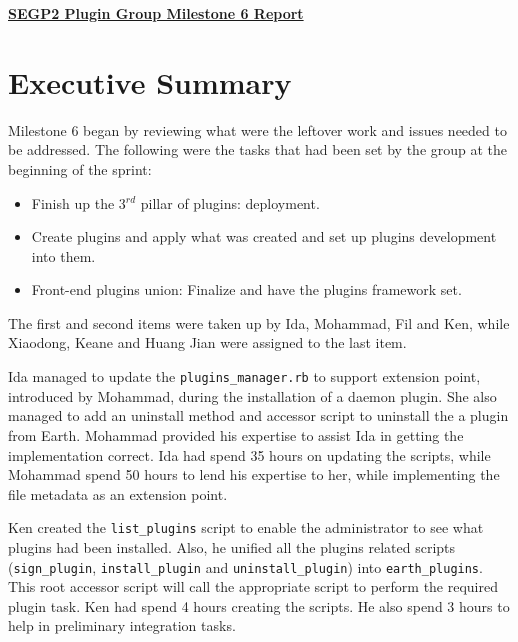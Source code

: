 \documentclass{article}
\begin{document}
\pagestyle{headings}

\begin{center}
{\textbf{\underline{SEGP2 Plugin Group Milestone 6 Report}}}
\end{center}


\section*{Executive Summary}

Milestone 6 began by reviewing what were the leftover work and issues needed to be addressed. The following were the tasks that had been set by the group at the beginning of the sprint:

\begin{itemize}
    \item Finish up the 3$^{rd}$ pillar of plugins: deployment.
    \item Create plugins and apply what was created and set up plugins development into them.
    \item Front-end plugins union: Finalize and have the plugins framework set.
\end{itemize}

The first and second items were taken up by Ida, Mohammad, Fil and Ken, while Xiaodong, Keane and Huang Jian were assigned to the last item. 

Ida managed to update the \texttt{plugins\_manager.rb} to support extension point, introduced by Mohammad, during the installation of a daemon plugin. She also managed to add an uninstall method and accessor script to uninstall the a plugin from Earth. Mohammad provided his expertise to assist Ida in getting the implementation correct. Ida had spend 35 hours on updating the scripts, while Mohammad spend 50 hours to lend his expertise to her, while implementing the file metadata as an extension point. 

Ken created the \texttt{list\_plugins} script to enable the administrator to see what plugins had been installed. Also, he unified all the plugins related scripts (\texttt{sign\_plugin}, \texttt{install\_plugin} and \texttt{uninstall\_plugin}) into \texttt{earth\_plugins}. This root accessor script will call the appropriate script to perform the required plugin task. Ken had spend 4 hours creating the scripts. He also spend 3 hours to help in preliminary integration tasks.
\end{document}
